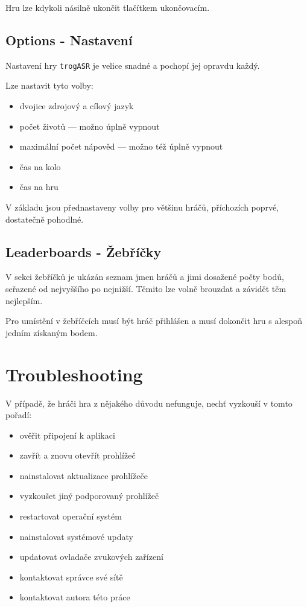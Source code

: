 Hru lze kdykoli násilně ukončit tlačítkem ukončovacím.

\subsection{Options - Nastavení}

Nastavení hry \verb|trogASR| je velice snadné a pochopí jej opravdu každý.

Lze nastavit tyto volby:

\begin{itemize}
\item dvojice zdrojový a cílový jazyk
\item počet životů --- možno úplně vypnout
\item maximální počet nápověd --- možno též úplně vypnout
\item čas na kolo
\item čas na hru
\end{itemize}

V základu jsou přednastaveny volby pro většinu hráčů, příchozích poprvé, dostatečně pohodlné.

\subsection{Leaderboards - Žebříčky}

V sekci žebříčků je ukázán seznam jmen hráčů a jimi dosažené počty bodů, seřazené od nejvyššího po nejnižší. Těmito lze volně brouzdat a závidět těm nejlepším.

Pro umístění v žebříčcích musí být hráč přihlášen a musí dokončit hru s alespoň jedním získaným bodem.

\section{Troubleshooting}

V případě, že hráči hra z nějakého důvodu nefunguje, nechť vyzkouší v tomto pořadí:

\begin{itemize}
\item ověřit připojení k aplikaci
\item zavřít a znovu otevřít prohlížeč
\item nainstalovat aktualizace prohlížeče
\item vyzkoušet jiný podporovaný prohlížeč
\item restartovat operační systém
\item nainstalovat systémové updaty
\item updatovat ovladače zvukových zařízení
\item kontaktovat správce své sítě
\item kontaktovat autora této práce
\end{itemize}